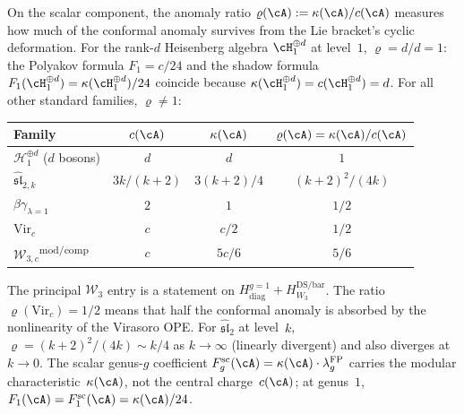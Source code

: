 \begin{remark}\label{rem:anomaly-ratio-polyakov}
On the scalar component, the anomaly ratio
$\varrho(\cA) := \kappa(\cA)/c(\cA)$ measures how much of the
conformal anomaly survives from the Lie bracket's cyclic deformation.
For the rank-$d$ Heisenberg algebra $\cH_1^{\oplus d}$ at level~$1$,
$\varrho = d/d = 1$: the Polyakov formula $F_1 = c/24$ and the shadow
formula $F_1(\cH_1^{\oplus d})=\kappa(\cH_1^{\oplus d})/24$ coincide
because $\kappa(\cH_1^{\oplus d})=c(\cH_1^{\oplus d})=d$. For all
other standard families, $\varrho \neq 1$:
\begin{center}
\begin{tabular}{lccc}
Family & $c(\cA)$ & $\kappa(\cA)$ & $\varrho(\cA)=\kappa(\cA)/c(\cA)$ \\ \hline
$\mathcal{H}_1^{\oplus d}$ \textup{($d$ bosons)} & $d$ & $d$ & $1$ \\
$\widehat{\mathfrak{sl}}_{2,k}$ & $3k/(k{+}2)$ & $3(k{+}2)/4$ & $(k{+}2)^2/(4k)$ \\
$\beta\gamma_{\lambda=1}$ & $2$ & $1$ & $1/2$ \\
$\mathrm{Vir}_c$ & $c$ & $c/2$ & $1/2$ \\
$\mathcal{W}_{3,c}$\textsuperscript{$\mathrm{mod/comp}$}
 & $c$ & $5c/6$ & $5/6$ \\
\end{tabular}
\end{center}
The principal $\mathcal W_3$ entry is a statement on
$H_{\mathrm{diag}}^{g=1}+H_{W_3}^{\mathrm{DS/bar}}$.
The ratio $\varrho(\mathrm{Vir}_c) = 1/2$ means that half the conformal anomaly is absorbed by the nonlinearity of the Virasoro OPE. For $\widehat{\mathfrak{sl}}_{2}$ at level~$k$, $\varrho = (k{+}2)^2/(4k) \sim k/4$ as $k \to \infty$ (linearly divergent) and also diverges at $k \to 0$. The scalar genus-$g$ coefficient
$F_g^{\mathrm{sc}}(\cA)=\kappa(\cA) \cdot \lambda_g^{\mathrm{FP}}$
carries the modular characteristic~$\kappa(\cA)$, not the central
charge~$c(\cA)$; at genus~$1$,
$F_1(\cA)=F_1^{\mathrm{sc}}(\cA)=\kappa(\cA)/24$.
\end{remark}

